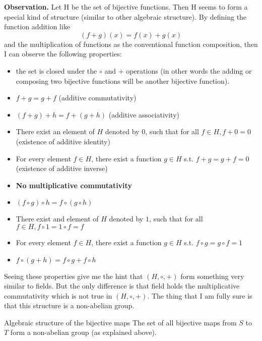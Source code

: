 \textbf{Observation.} Let H be the set of bijective functions. Then H seems to form a special kind of structure (similar to other algebraic structure). By defining the function addition like \[ (f+g)(x) = f(x) + g(x) \] and the multiplication of functions as the conventional function composition, then I can observe the following properties:
\begin{itemize}
	\item the set is closed under the $\circ$ and $+$ operations (in other words the adding or composing two bijective functions will be another bijective function).
	\item $f+g = g+f$ (additive commutativity)
	\item $(f+g)+h = f+(g+h)$ (additive associativity)
	\item There exist an element of $H$ denoted by 0, such that for all $f \in H, f+0 = 0$ (existence of additive identity)
	\item For every element $f \in H$, there exist a function $g \in H$ s.t. $f+g = g+f = 0$ (existence of additive inverse)
	\item \textbf{No multiplicative commutativity}
	\item $(f \circ g) \circ h = f \circ (g \circ h)$
	\item There exist and element of $H$ denoted by $1$, such that for all $f \in H, f \circ 1 = 1 \circ f = f$
	\item For every element $f \in H$, there exist a function $g \in H$ s.t. $f \circ g = g \circ f = 1$
	\item $f \circ (g+h) = f \circ g + f \circ h$
\end{itemize}

Seeing these properties give me the hint that $(H,\circ,+)$ form something very similar to fields. But the only difference is that field holds the multiplicative commutativity which is not true in $(H,\circ,+)$. The thing that I am fully sure is that this structure is a non-abelian group.

\begin{thmbox}{Algebraic structure of the bijective maps}
	The set of all bijective maps from $S$ to $T$ form a non-abelian group (as explained above).
\end{thmbox}